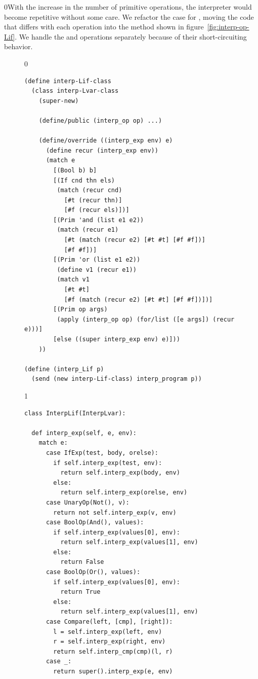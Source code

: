 \documentclass[7x10]{TimesAPriori_MIT}%
\def\racketEd{0}
\def\pythonEd{1}
\def\edition{0}
\newcommand{\racket}[1]{{\if\edition\racketEd{#1}\fi}}
\numberwithin{theorem}{chapter}
\numberwithin{definition}{chapter}
\numberwithin{equation}{chapter}
\begin{document}
\racket{With the increase in the number of primitive operations, the
  interpreter would become repetitive without some care.  We refactor
  the case for \code{Prim}, moving the code that differs with each
  operation into the \code{interp\_op} method shown in
  figure~\ref{fig:interp-op-Lif}. We handle the \code{and} and
  \code{or} operations separately because of their short-circuiting
  behavior.}

\begin{figure}[tbp]
\begin{tcolorbox}[colback=white]
{\if\edition\racketEd    
\begin{lstlisting}
(define interp-Lif-class
  (class interp-Lvar-class
    (super-new)

    (define/public (interp_op op) ...)

    (define/override ((interp_exp env) e)
      (define recur (interp_exp env))
      (match e
        [(Bool b) b]
        [(If cnd thn els)
         (match (recur cnd)
           [#t (recur thn)]
           [#f (recur els)])]
        [(Prim 'and (list e1 e2))
         (match (recur e1)
           [#t (match (recur e2) [#t #t] [#f #f])]
           [#f #f])]
        [(Prim 'or (list e1 e2))
         (define v1 (recur e1))
         (match v1
           [#t #t]
           [#f (match (recur e2) [#t #t] [#f #f])])]
        [(Prim op args)
         (apply (interp_op op) (for/list ([e args]) (recur e)))]
        [else ((super interp_exp env) e)]))
    ))

(define (interp_Lif p)
  (send (new interp-Lif-class) interp_program p))
\end{lstlisting}
\fi}
{\if\edition\pythonEd
\begin{lstlisting}
class InterpLif(InterpLvar):

  def interp_exp(self, e, env):
    match e:
      case IfExp(test, body, orelse):
        if self.interp_exp(test, env):
          return self.interp_exp(body, env)
        else:
          return self.interp_exp(orelse, env)
      case UnaryOp(Not(), v):
        return not self.interp_exp(v, env)
      case BoolOp(And(), values):
        if self.interp_exp(values[0], env):
          return self.interp_exp(values[1], env)
        else:
          return False
      case BoolOp(Or(), values):
        if self.interp_exp(values[0], env):
          return True
        else:
          return self.interp_exp(values[1], env)
      case Compare(left, [cmp], [right]):
        l = self.interp_exp(left, env)
        r = self.interp_exp(right, env)
        return self.interp_cmp(cmp)(l, r)
      case _:
        return super().interp_exp(e, env)


\end{lstlisting}}
\end{tcolorbox}
\end{figure}
\end{document}
